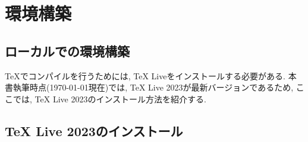 \section{環境構築}
\subsection{ローカルでの環境構築}
\TeX でコンパイルを行うためには, TeX Liveをインストールする必要がある. 
本書執筆時点(\today 現在)では, TeX Live 2023が最新バージョンであるため, 
ここでは, TeX Live 2023のインストール方法を紹介する. 
\subsection{TeX Live 2023のインストール}
